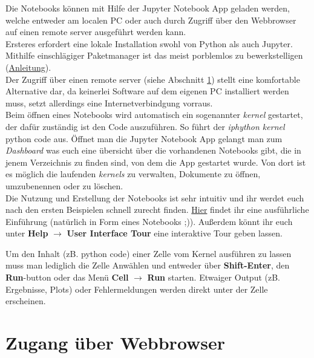 \documentclass[oneside,bibliography=totoc,listof=totoc,BCOR=5mm,DIV=12,colorlinks=true,linkcolor=blue,citecolor=black, urlcolor=blue]{article}
\begin{document}
\noindent Die Notebooks können mit Hilfe der Jupyter Notebook App geladen werden, welche entweder am localen PC oder auch durch Zugriff über den Webbrowser auf einen remote server ausgeführt werden kann.\\
\noindent Ersteres erfordert eine lokale Installation swohl von Python als auch Jupyter. Mithilfe einschlägiger Paketmanager ist das meist porblemlos zu bewerkstelligen (\href{http://jupyter.org/install.html}{Anleitung}).
\\
\noindent Der Zugriff über einen remote server (siehe Abschnitt \ref{sec:org10423f3}) stellt eine komfortable Alternative dar, da keinerlei Software auf dem eigenen PC installiert werden muss, setzt allerdings eine Internetverbindgung vorraus.
\\
\noindent Beim öffnen eines Notebooks wird automatisch ein sogenannter \emph{kernel} gestartet, der dafür zuständig ist den Code auszuführen. So führt der \emph{iphython kernel} python code aus.
\noindent Öffnet man die  Jupyter Notebook App gelangt man zum \emph{Dashboard} was euch eine übersicht über die vorhandenen Notebooks gibt, die in jenem Verzeichnis zu finden sind, von dem die App gestartet wurde. Von dort ist es möglich die laufenden \emph{kernels} zu verwalten, Dokumente zu öffnen, umzubenennen oder zu löschen.
\\
\noindent Die Nutzung und Erstellung der Notebooks ist sehr intuitiv und ihr werdet euch nach den ersten Beispielen schnell zurecht finden.
\href{https://hub.mybinder.org/user/ipython-ipython-in-depth-heujngzw/notebooks/binder/Index.ipynb}{Hier} findet ihr eine ausführliche Einführung (natürlich in Form eines Notebooks ;)). Außerdem könnt ihr euch unter \textbf{Help} \(\rightarrow\) \textbf{User Interface Tour} eine interaktive Tour geben lassen.

\noindent Um den Inhalt (zB. python code) einer Zelle vom Kernel ausführen zu lassen muss man lediglich die Zelle Anwählen und entweder über \textbf{Shift-Enter}, den \textbf{Run}-button oder das Menü \textbf{Cell} \(\rightarrow\) \textbf{Run} starten. Etwaiger Output (zB. Ergebnisse, Plots) oder Fehlermeldungen werden direkt unter der Zelle erscheinen.



\section{Zugang über Webbrowser}
\label{sec:org10423f3}
\end{document}
